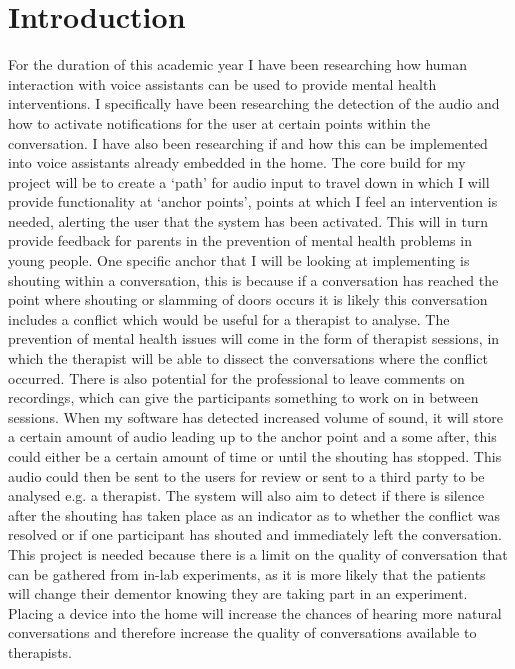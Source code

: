 \documentclass[a4paper,11pt]{report}
\begin{document}
\chapter{Introduction}
For the duration of this academic year I have been researching how human interaction with voice assistants can be used to provide mental health interventions. I specifically have been researching the detection of the audio and how to activate notifications for the user at certain points within the conversation. I have also been researching if and how this can be implemented into voice assistants already embedded in the home. The core build for my project will be to create a ‘path’ for audio input to travel down in which I will provide functionality at ‘anchor points’, points at which I feel an intervention is needed, alerting the user that the system has been activated. This will in turn provide feedback for parents in the prevention of mental health problems in young people. One specific anchor that I will be looking at implementing is shouting within a conversation, this is because if a conversation has reached the point where shouting or slamming of doors occurs it is likely this conversation includes a conflict which would be useful for a therapist to analyse. The prevention of mental health issues will come in the form of therapist sessions, in which the therapist will be able to dissect the conversations where the conflict occurred. There is also potential for the professional to leave comments on recordings, which can give the participants something to work on in between sessions. When my software has detected increased volume of sound, it will store a certain amount of audio leading up to the anchor point and a some after, this could either be a certain amount of time or until the shouting has stopped. This audio could then be sent to the users for review or sent to a third party to be analysed e.g. a therapist. The system will also aim to detect if there is silence after the shouting has taken place as an indicator as to whether the conflict was resolved or if one participant has shouted and immediately left the conversation. This project is needed because there is a limit on the quality of conversation that can be gathered from in-lab experiments, as it is more likely that the patients will change their dementor knowing they are taking part in an experiment. Placing a device into the home will increase the chances of hearing more natural conversations and therefore increase the quality of conversations available to therapists. \\
\end{document}
